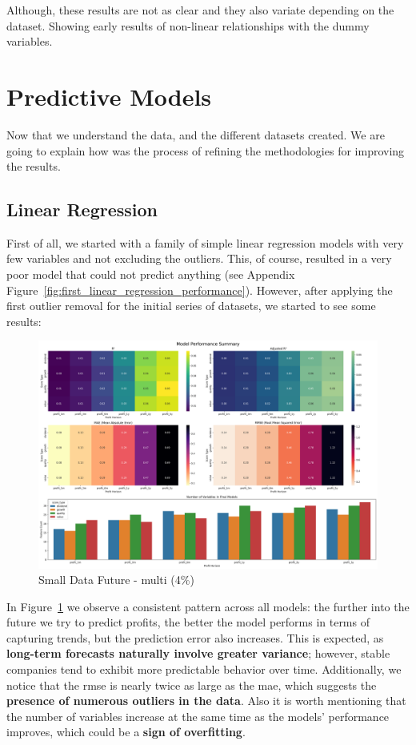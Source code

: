 \documentclass[11pt,english,a4paper,hidelinks]{book}
\begin{document}
\noindent Although, these results are not as clear and they also variate depending on the dataset. Showing early results of non-linear relationships with the dummy variables.

\section{Predictive Models}

Now that we understand the data, and the different datasets created. We are going to explain how was the process of refining the methodologies for improving the results.

\subsection{Linear Regression}

First of all, we started with a family of simple linear regression models with very few variables and not excluding the outliers. This, of course, resulted in a very poor model that could not predict anything (see Appendix Figure~\ref{fig:first_linear_regression_performance}). However, after applying the first outlier removal for the initial series of datasets, we started to see some results:

\begin{figure}[H]
    \centering
    \includegraphics[width=1\textwidth]{images/code/models/linear_regression/first_model/Small Data future - Multi performance.png}
    \caption{Small Data Future - \acrshort{multi} (4\%)}
    \label{fig:first_linear_regression}
\end{figure}

\noindent In Figure~\ref{fig:first_linear_regression} we observe a consistent pattern across all models: the further into the future we try to predict profits, the better the model performs in terms of capturing trends, but the prediction error also increases. This is expected, as \textbf{long-term forecasts naturally involve greater variance}; however, stable companies tend to exhibit more predictable behavior over time. Additionally, we notice that the \acrshort{rmse} is nearly twice as large as the \acrshort{mae}, which suggests the \textbf{presence of numerous outliers in the data}. Also it is worth mentioning that the number of variables increase at the same time as the models' performance improves, which could be a \textbf{sign of overfitting}.
\end{document}
